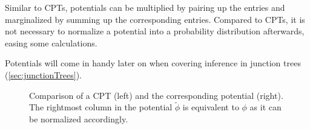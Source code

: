			Similar to CPTs, potentials can be multiplied by pairing up the entries and marginalized by summing up the corresponding entries. Compared to CPTs, it is not necessary to normalize a potential into a probability distribution afterwards, easing some calculations.

			Potentials will come in handy later on when covering inference in junction trees (\autoref{sec:junctionTrees}).

			\begin{figure}
				\caption[Comparison of CPT and Potential]{Comparison of a CPT (left) and the corresponding potential (right). The rightmost column in the potential \( \tilde{\phi} \) is equivalent to \( \phi \) as it can be normalized accordingly.}
				\label{fig:potetial}
			\end{figure}

